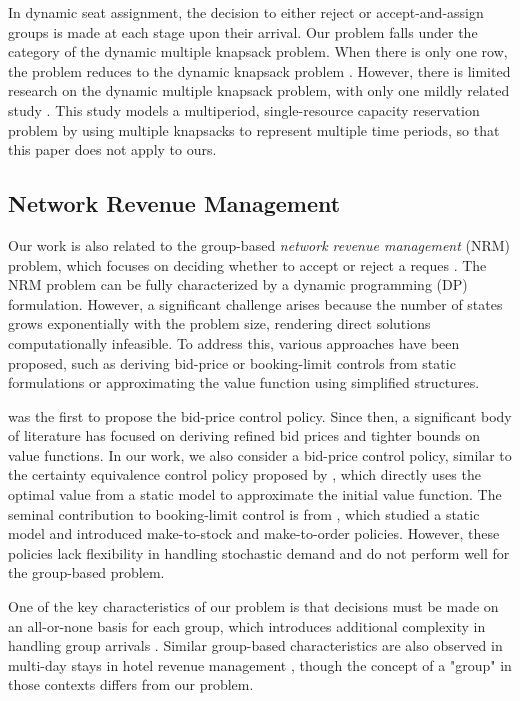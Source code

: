 
In dynamic seat assignment, the decision to either reject or accept-and-assign groups is made at each stage upon their arrival. Our problem falls under the category of the dynamic multiple knapsack problem. When there is only one row, the problem reduces to the dynamic knapsack problem \cite{kleywegt1998dynamic}. However, there is limited research on the dynamic multiple knapsack problem, with only one mildly related study \cite{perry2009approximate}. This study models a multiperiod, single-resource capacity reservation problem by using multiple knapsacks to represent multiple time periods, so that this paper does not apply to ours.


\subsection{Network Revenue Management}
Our work is also related to the group-based \textit{network revenue management} (NRM) problem, which focuses on deciding whether to accept or reject a reques \cite{gallego1997multiproduct}. The NRM problem can be fully characterized by a dynamic programming (DP) formulation. However, a significant challenge arises because the number of states grows exponentially with the problem size, rendering direct solutions computationally infeasible. To address this, various approaches have been proposed, such as deriving bid-price or booking-limit controls from static formulations or approximating the value function using simplified structures.

\cite{talluri1998analysis} was the first to propose the bid-price control policy. Since then, a significant body of literature has focused on deriving refined bid prices and tighter bounds on value functions. In our work, we also consider a bid-price control policy, similar to the certainty equivalence control policy proposed by \cite{bertsimas2003revenue}, which directly uses the optimal value from a static model to approximate the initial value function. The seminal contribution to booking-limit control is from \cite{gallego1997multiproduct}, which studied a static model and introduced make-to-stock and make-to-order policies. However, these policies lack flexibility in handling stochastic demand and do not perform well for the group-based problem.


One of the key characteristics of our problem is that decisions must be made on an all-or-none basis for each group, which introduces additional complexity in handling group arrivals \cite{talluri2006theory}. Similar group-based characteristics are also observed in multi-day stays in hotel revenue management \cite{aydin2018decomposition, bitran1995application}, though the concept of a "group" in those contexts differs from our problem.


